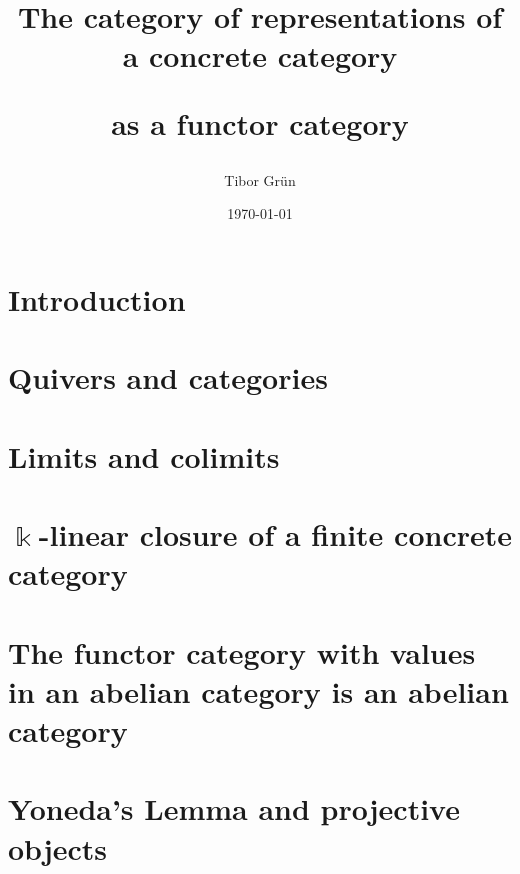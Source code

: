 \documentclass[a4paper,12pt,twoside]{article}
\title{The category of representations of a concrete category\par as a functor category}
\author{Tibor Gr{\"u}n}
\date{\today}
\begin{document}

	

	\newpage
	\newpage

	\tableofcontents\label{toc}
	
	\newpage
	\phantom{}%
	\newpage

	
\section{Introduction}


\section{Quivers and categories}\label{sec:quivers_categories}


\section{Limits and colimits}\label{sec:limits_colimits}


\section{$\Bbbk$-linear closure of a finite concrete category}\label{sec:algebroids}


\section{The functor category with values in an abelian category is an abelian category}\label{sec:functor_cat_abelian}


\section{Yoneda's Lemma and projective objects}\label{sec:yoneda_projective}

\end{document}
